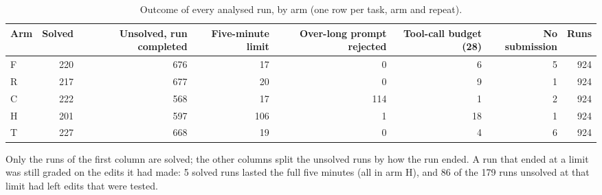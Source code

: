\begin{table}[!htb]
\centering
\caption{Outcome of every analysed run, by arm (one row per task, arm and repeat).}\label{tab:s-outcomes}
\footnotesize
\begin{tabular}{lrrrrrrr}
\toprule
Arm & \parbox[b]{1.75cm}{\raggedleft Solved} & \parbox[b]{1.75cm}{\raggedleft Unsolved, run completed} & \parbox[b]{1.75cm}{\raggedleft Five-minute limit} & \parbox[b]{1.75cm}{\raggedleft Over-long prompt rejected} & \parbox[b]{1.75cm}{\raggedleft Tool-call budget (28)} & \parbox[b]{1.75cm}{\raggedleft No submission} & Runs \\
\midrule
F & 220 & 676 & 17 & 0 & 6 & 5 & 924 \\
R & 217 & 677 & 20 & 0 & 9 & 1 & 924 \\
C & 222 & 568 & 17 & 114 & 1 & 2 & 924 \\
H & 201 & 597 & 106 & 1 & 18 & 1 & 924 \\
T & 227 & 668 & 19 & 0 & 4 & 6 & 924 \\
\bottomrule
\end{tabular}

\par\smallskip\parbox{0.96\linewidth}{\footnotesize Only the runs of the first column are solved; the other columns split the unsolved runs by how the run ended. A run that ended at a limit was still graded on the edits it had made: 5 solved runs lasted the full five minutes (all in arm H), and 86 of the 179 runs unsolved at that limit had left edits that were tested.}
\end{table}
